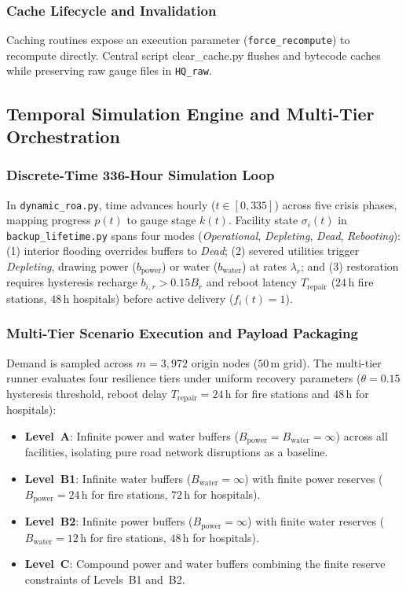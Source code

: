 \subsubsection{Cache Lifecycle and Invalidation}
Caching routines expose an execution parameter (\texttt{force\_recompute}) to recompute directly.
Central script clear\_cache.py flushes  and bytecode caches while preserving raw gauge files in \texttt{HQ\_raw}.

\subsection{Temporal Simulation Engine and Multi-Tier Orchestration}
\label{subsec:simulation-engine}

\subsubsection{Discrete-Time 336-Hour Simulation Loop}
In \texttt{dynamic\_roa.py}, time advances hourly ($t \in [0, 335]$) across five crisis phases, mapping progress $p(t)$ to gauge stage $k(t)$.
Facility state $\sigma_i(t)$ in \texttt{backup\_lifetime.py} spans four modes (\textit{Operational}, \textit{Depleting}, \textit{Dead}, \textit{Rebooting}):
(1) interior flooding overrides buffers to \textit{Dead};
(2) severed utilities trigger \textit{Depleting}, drawing power ($b_{\text{power}}$) or water ($b_{\text{water}}$) at rates $\lambda_r$; and
(3) restoration requires hysteresis recharge $b_{i,r} > 0.15 B_r$ and reboot latency $T_{\text{repair}}$ ($24\,\text{h}$ fire stations, $48\,\text{h}$ hospitals) before active delivery ($f_i(t)=1$).

\subsubsection{Multi-Tier Scenario Execution and Payload Packaging}
Demand is sampled across $m = 3{,}972$ origin nodes ($50\,\text{m}$ grid).
The multi-tier runner evaluates four resilience tiers under uniform recovery parameters ($\theta = 0.15$ hysteresis threshold, reboot delay $T_{\text{repair}} = 24\,\text{h}$ for fire stations and $48\,\text{h}$ for hospitals):

\begin{itemize}
  \item \textbf{Level~A}: Infinite power and water buffers ($B_{\text{power}} = B_{\text{water}} = \infty$) across all facilities, isolating pure road network disruptions as a baseline.
  \item \textbf{Level~B1}: Infinite water buffers ($B_{\text{water}} = \infty$) with finite power reserves ($B_{\text{power}} = 24\,\text{h}$ for fire stations, $72\,\text{h}$ for hospitals).
  \item \textbf{Level~B2}: Infinite power buffers ($B_{\text{power}} = \infty$) with finite water reserves ($B_{\text{water}} = 12\,\text{h}$ for fire stations, $48\,\text{h}$ for hospitals).
  \item \textbf{Level~C}: Compound power and water buffers combining the finite reserve constraints of Levels~B1 and~B2.
\end{itemize}

